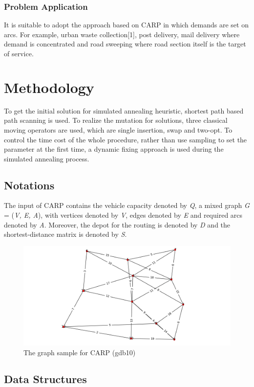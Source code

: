 \documentclass[9pt,shortpaper,twoside,web]{ieeecolor}
\begin{document}
\subsubsection{Problem Application}
It is suitable to adopt the approach based on CARP in which demands are set on arcs. For example, urban waste collection[1], post delivery, mail delivery where demand is concentrated and road sweeping where road section itself is the target of service.

\section{Methodology}
To get the initial solution for simulated annealing heuristic, shortest path based path scanning is used. To realize the mutation for solutions, three classical moving operators are used, which are single insertion, swap and two-opt. To control the time cost of the whole procedure, rather than use sampling to set the parameter at the first time, a dynamic fixing approach is used during the simulated annealing process.
\subsection{Notations}
The input of CARP contains the vehicle capacity denoted by \textit{Q}, a mixed graph \textit{G} = (\textit{V, E, A}), with vertices denoted by \textit{V}, edges denoted by \textit{E} and required arcs denoted by \textit{A}. Moreover, the depot for the routing is denoted by \textit{D} and the shortest-distance matrix is denoted by \textit{S}.

\begin{figure}[!t]
\centering
\captionsetup{justification=centering}
\includegraphics[width=\columnwidth]{gdb10.png}
\caption{The graph sample for CARP (gdb10)}
\label{fig1}
\end{figure}

\subsection{Data Structures}
\end{document}
